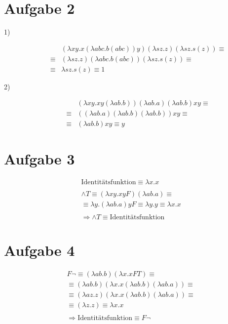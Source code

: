 \documentclass[11]{article}
\begin{document}
\section*{Aufgabe 2}
\begin{description}
\item[1)] \textbf{}
\begin{align*}
& (\lambda xy.x(\lambda abc.b(abc))y) (\lambda sz.z) (\lambda sz.s(z)) \equiv \\
\equiv & (\lambda sz.z) (\lambda abc.b(abc))(\lambda sz.s(z)) \equiv \\
\equiv & \lambda sz.s(z) \equiv 1
\end{align*}
\item[2)] \textbf{}
\begin{align*}
& (\lambda xy.xy(\lambda ab.b))(\lambda ab.a) (\lambda ab.b)xy \equiv \\
\equiv & ((\lambda ab.a)(\lambda ab.b)(\lambda ab.b))xy \equiv \\
\equiv & (\lambda ab.b) x y \equiv y
\end{align*}
\end{description}
%
\section*{Aufgabe 3}
\begin{align*}
& \text{Identitätsfunktion} \equiv \lambda x.x \\ \\
& \land T \equiv (\lambda xy.xyF)(\lambda ab.a) \equiv \\
& \equiv \lambda y.(\lambda ab.a)yF \equiv \lambda y.y \equiv \lambda x.x \\ \\
& \Rightarrow \land T \equiv \text{Identitätsfunktion}
\end{align*}
%
\section*{Aufgabe 4}
\begin{align*}
& F \neg \equiv (\lambda ab.b)(\lambda x.xFT) \equiv \\
& \equiv (\lambda ab.b)(\lambda x.x(\lambda ab.b)(\lambda ab.a)) \equiv \\
& \equiv (\lambda az.z)(\lambda x.x(\lambda ab.b)(\lambda ab.a)) \equiv \\
& \equiv (\lambda z.z) \equiv \lambda x.x \\ \\
& \Rightarrow \text{Identitätsfunktion} \equiv F \neg
\end{align*}
%
\end{document}

